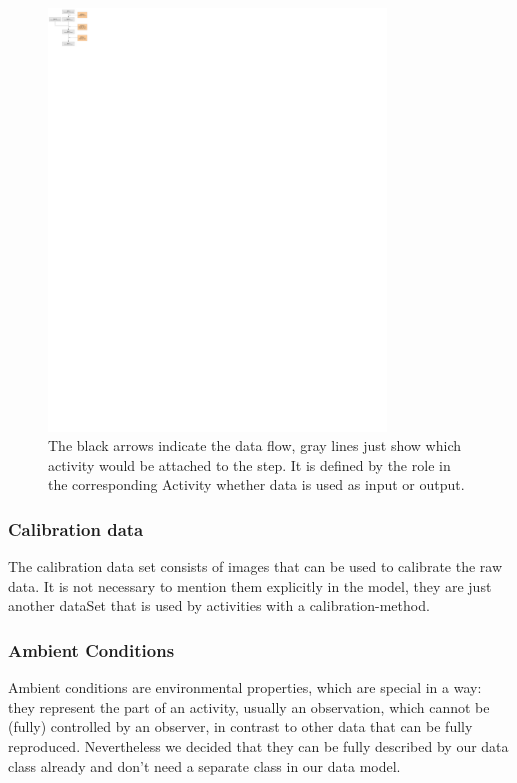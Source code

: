 \documentclass[11pt,a4paper]{ivoa}
\begin{document}
\begin{figure}
\centering
\includegraphics[width=0.8\textwidth]{ProvDM-activities.png}
\caption{The black arrows indicate the
data flow, gray lines just show which activity would be attached to the step. It
is defined by the role in the corresponding Activity whether data is used as input
or output.}
\label{fig:activities}
\end{figure}



\subsubsection{Calibration data}
The calibration data set consists of images that can be used to calibrate the
raw data. It is not necessary to mention them explicitly in the model, they are just another dataSet that is used by activities with a calibration-method.


\subsubsection{Ambient Conditions}

Ambient conditions are environmental properties, which are special in a way: 
they represent the part of an activity, usually an observation, which cannot be 
(fully) controlled by an
observer, in contrast to other data that can be fully reproduced.
Nevertheless we decided that they can be fully described by our 
data class already and don't need a separate class in our data model. 
\end{document}
